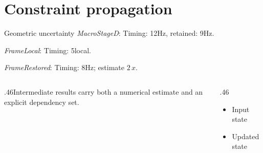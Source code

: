 \documentclass[11pt,aspectratio=169]{beamer}
\newcommand{\fuzzlayerA}[1]{\textit{#1}}
\newcommand{\fuzzlayerB}[1]{\fuzzlayerA{#1}}
\newcommand{\fuzzterm}[1]{\fuzzlayerB{#1}}
\newcommand{\fuzzpair}[2]{\fuzzterm{#1}: #2}
\newcommand{\fuzzunit}{Hz}
\let\fuzzoriginalunit\fuzzunit
\newcommand{\fuzzcoefficient}{2}
\newcommand{\fuzzscale}[2][\fuzzcoefficient]{#1\,#2}
\begin{document}
\section{Constraint propagation}
\begin{frame}[t]{Geometric uncertainty}
\fuzzpair{MacroStageD}{Timing: 12\fuzzunit, retained: 9\fuzzoriginalunit.}\par
{\renewcommand{\fuzzunit}{local}\fuzzpair{FrameLocal}{Timing: 5\fuzzunit.}\par}
\fuzzpair{FrameRestored}{Timing: 8\fuzzunit; estimate $\fuzzscale{x}$.}\par
\begin{columns}[T]\begin{column}{.46\textwidth}Intermediate results carry both a numerical estimate and an explicit dependency set.\end{column}\begin{column}{.46\textwidth}\begin{itemize}\item Input state\item Updated state\end{itemize}\end{column}\end{columns}
\end{frame}
\end{document}
